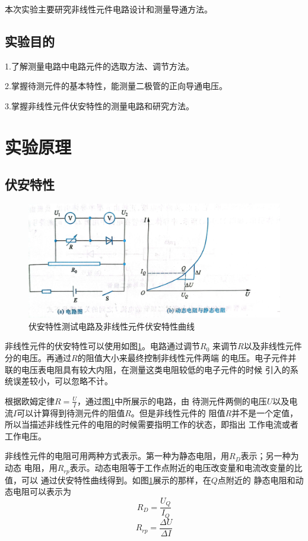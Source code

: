 \documentclass{ctexart}
\begin{document}
  本次实验主要研究非线性元件电路设计和测量导通方法。

  \subsection{实验目的}
  1.\quad 了解测量电路中电路元件的选取方法、调节方法。

  2.\quad 掌握待测元件的基本特性，能测量二极管的正向导通电压。
  
  3.\quad 掌握非线性元件伏安特性的测量电路和研究方法。

\section{实验原理}
  \subsection{伏安特性}
  \begin{figure}[t]
    \centering
    \includegraphics[width=1\textwidth]{fuantexingdianlu.jpg}
    \caption{伏安特性测试电路及非线性元件伏安特性曲线}\label{fuantexingdianlu}
  \end{figure}
  非线性元件的伏安特性可以使用如图\ref{fuantexingdianlu}。电路通过调节$R_{0}$
  来调节$R$以及非线性元件分的电压。再通过$R$的阻值大小来最终控制非线性元件两端
  的电压。电子元件并联的电压表电阻具有较大内阻，在测量这类电阻较低的电子元件的时候
  引入的系统误差较小，可以忽略不计。

  根据欧姆定律$R=\frac{U}{I}$，通过图\ref{fuantexingdianlu}中所展示的电路，由
  待测元件两侧的电压$U$以及电流$I$可以计算得到待测元件的阻值$R$。但是非线性元件的
  阻值$R$并不是一个定值，所以当描述非线性元件的电阻的时候需要指明工作的状态，即指出
  工作电流或者工作电压。

  非线性元件的电阻可用两种方式表示。第一种为静态电阻，用$R_{D}$表示；另一种为动态
  电阻，用$R_{rp}$表示。动态电阻等于工作点附近的电压改变量和电流改变量的比值，可以
  通过伏安特性曲线得到。如图\ref{fuantexingdianlu}展示的那样，在$Q$点附近的
  静态电阻和动态电阻可以表示为
  \begin{equation}
    R_{D}=\frac{U_{Q}}{I_{Q}}
  \end{equation}
  \begin{equation}
    R_{rp}=\frac{\Delta U}{\Delta I}
  \end{equation}
\end{document}
